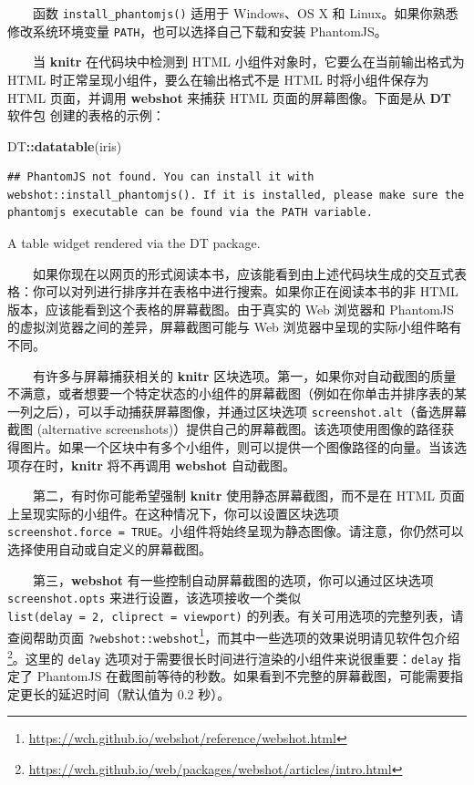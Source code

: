 \documentclass[
  12pt,
]{krantz}
\newenvironment{Shaded}{\begin{snugshade}}{\end{snugshade}}
\newcommand{\FunctionTok}[1]{\textcolor[rgb]{0.13,0.29,0.53}{\textbf{#1}}}
\newcommand{\NormalTok}[1]{#1}
\newcommand{\SpecialCharTok}[1]{\textcolor[rgb]{0.81,0.36,0.00}{\textbf{#1}}}
\renewcommand{\href}[2]{#2\footnote{\url{#1}}}
\theoremstyle{definition}
\theoremstyle{definition}
\theoremstyle{definition}
\theoremstyle{definition}
\theoremstyle{remark}
\begin{document}
  函数 \texttt{install\_phantomjs()} 适用于 Windows、OS X 和 Linux。如果你熟悉修改系统环境变量 \texttt{PATH}，也可以选择自己下载和安装 PhantomJS。

  当 \textbf{knitr} 在代码块中检测到 HTML 小组件对象时，它要么在当前输出格式为 HTML 时正常呈现小组件，要么在输出格式不是 HTML 时将小组件保存为 HTML 页面，并调用 \textbf{webshot} 来捕获 HTML 页面的屏幕图像。下面是从 \textbf{DT} 软件包 \citep{R-DT} 创建的表格的示例：

\begin{Shaded}
\begin{Highlighting}[]
\NormalTok{DT}\SpecialCharTok{::}\FunctionTok{datatable}\NormalTok{(iris)}
\end{Highlighting}
\end{Shaded}

\begin{verbatim}
## PhantomJS not found. You can install it with webshot::install_phantomjs(). If it is installed, please make sure the phantomjs executable can be found via the PATH variable.
\end{verbatim}

\label{fig:DT-demo}A table widget rendered via the DT package.

  如果你现在以网页的形式阅读本书，应该能看到由上述代码块生成的交互式表格：你可以对列进行排序并在表格中进行搜索。如果你正在阅读本书的非 HTML 版本，应该能看到这个表格的屏幕截图。由于真实的 Web 浏览器和 PhantomJS 的虚拟浏览器之间的差异，屏幕截图可能与 Web 浏览器中呈现的实际小组件略有不同。

  有许多与屏幕捕获相关的 \textbf{knitr} 区块选项。第一，如果你对自动截图的质量不满意，或者想要一个特定状态的小组件的屏幕截图（例如在你单击并排序表的某一列之后），可以手动捕获屏幕图像，并通过区块选项 \texttt{screenshot.alt}（备选屏幕截图 (alternative screenshots)）提供自己的屏幕截图。该选项使用图像的路径获得图片。如果一个区块中有多个小组件，则可以提供一个图像路径的向量。当该选项存在时，\textbf{knitr} 将不再调用 \textbf{webshot} 自动截图。

  第二，有时你可能希望强制 \textbf{knitr} 使用静态屏幕截图，而不是在 HTML 页面上呈现实际的小组件。在这种情况下，你可以设置区块选项 \texttt{screenshot.force\ =\ TRUE}。小组件将始终呈现为静态图像。请注意，你仍然可以选择使用自动或自定义的屏幕截图。

  第三，\textbf{webshot} 有一些控制自动屏幕截图的选项，你可以通过区块选项 \texttt{screenshot.opts} 来进行设置，该选项接收一个类似 \texttt{list(delay\ =\ 2,\ cliprect\ =\ \textquotesingle{}viewport\textquotesingle{})} 的列表。有关可用选项的完整列表，请查阅帮助页面 \href{https://wch.github.io/webshot/reference/webshot.html}{\texttt{?webshot::webshot}}，而其中一些选项的效果说明请见\href{https://wch.github.io/web/packages/webshot/articles/intro.html}{软件包介绍}。这里的 \texttt{delay} 选项对于需要很长时间进行渲染的小组件来说很重要：\texttt{delay} 指定了 PhantomJS 在截图前等待的秒数。如果看到不完整的屏幕截图，可能需要指定更长的延迟时间（默认值为 0.2 秒）。
\end{document}
